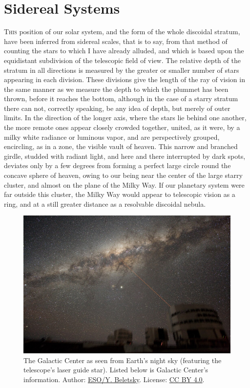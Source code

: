 
\chapter{Sidereal Systems}

\lettrine[lines=4]{\goudy T}{his} position of our solar system, and the form of the whole discoidal stratum, have been inferred from sidereal scales, that is to say, from that method of counting the stars to which I have already alluded, and which is based upon the equidistant subdivision of the telescopic field of view. The relative depth of the stratum in all directions is measured by the greater or smaller number of stars appearing in each division. These divisions give the length of the ray of vision in the same manner as we measure the depth to which the plummet has been thrown, before it reaches the bottom, although in the case of a starry stratum there can not, correctly speaking, be any idea of depth, but merely of outer limits. In the direction of the longer axis, where the stars lie behind one another, the more remote ones appear closely crowded together, united, as it were, by a milky white radiance or luminous vapor, and are perspectively grouped, encircling, as in a zone, the visible vault of heaven. This narrow and branched girdle, studded with radiant light, and here and there interrupted by dark spots, deviates only by a few degrees from forming a perfect large circle round the concave sphere of heaven, owing to our being near the center of the large starry cluster, and almost on the plane of the Milky Way. If our planetary system were far outside this cluster, the Milky Way would appear to telescopic vision as a ring, and at a still greater distance as a resolvable discoidal nebula.
\clearpage
\begin{figure}[h]
    \centering
    \includegraphics[width=.9\textwidth]{../../pictures/ESO-VLT-Laser-phot-33a-07.jpg}
    \caption{The Galactic Center as seen from Earth's night sky (featuring the telescope's laser guide star). Listed below is Galactic Center's information. Author: \href{https://en.wikipedia.org/wiki/File:ESO-VLT-Laser-phot-33a-07.jpg}{ESO/Y. Beletsky}. License: \href{https://creativecommons.org/licenses/by/4.0}{CC BY 4.0}.}
    \label{fig:eso-vlt-laser}
\end{figure}


